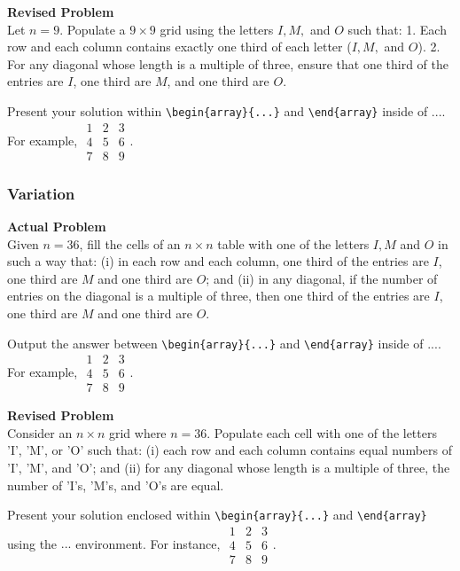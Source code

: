 \textbf{Revised Problem}\\
Let \( n = 9 \). Populate a \( 9 \times 9 \) grid using the letters \( I, M, \) and \( O \) such that:
1. Each row and each column contains exactly one third of each letter (\( I, M, \) and \( O \)).
2. For any diagonal whose length is a multiple of three, ensure that one third of the entries are \( I \), one third are \( M \), and one third are \( O \).

Present your solution within \verb|\begin{array}{...}| and \verb|\end{array}| inside of $\boxed{...}$. For example, $\boxed{\begin{array}{ccc}1 & 2 & 3 \\ 4 & 5 & 6 \\ 7 & 8 & 9\end{array}}$.

\subsubsection{Variation}
\textbf{Actual Problem}\\
Given $n = 36$, fill the cells of an $n \times n$ table with one of the letters $I,M$ and $O$ in such a way that:
(i) in each row and each column, one third of the entries are $I$, one third are $M$ and one third are $O$; and
(ii) in any diagonal, if the number of entries on the diagonal is a multiple of three, then one third of the entries are $I$, one third are $M$ and one third are $O$.

Output the answer between \verb|\begin{array}{...}| and \verb|\end{array}| inside of $\boxed{...}$. For example, $\boxed{\begin{array}{ccc}1 & 2 & 3 \\ 4 & 5 & 6 \\ 7 & 8 & 9\end{array}}$.

\textbf{Revised Problem}\\
Consider an $n \times n$ grid where $n = 36$. Populate each cell with one of the letters 'I', 'M', or 'O' such that:
(i) each row and each column contains equal numbers of 'I', 'M', and 'O'; and
(ii) for any diagonal whose length is a multiple of three, the number of 'I's, 'M's, and 'O's are equal.

Present your solution enclosed within \verb|\begin{array}{...}| and \verb|\end{array}| using the $\boxed{...}$ environment. For instance, $\boxed{\begin{array}{ccc}1 & 2 & 3 \\ 4 & 5 & 6 \\ 7 & 8 & 9\end{array}}$.

